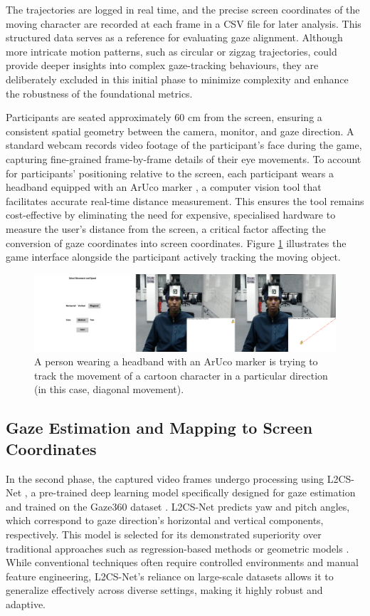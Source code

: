\documentclass[10pt,a4paper,twoside]{article}
\begin{document}
The trajectories are logged in real time, and the precise screen coordinates of the moving character are recorded at each frame in a CSV file for later analysis. This structured data serves as a reference for evaluating gaze alignment. Although more intricate motion patterns, such as circular or zigzag trajectories, could provide deeper insights into complex gaze-tracking behaviours, they are deliberately excluded in this initial phase to minimize complexity and enhance the robustness of the foundational metrics.

Participants are seated approximately 60 cm from the screen, ensuring a consistent spatial geometry between the camera, monitor, and gaze direction. A standard webcam records video footage of the participant’s face during the game, capturing fine-grained frame-by-frame details of their eye movements. To account for participants’ positioning relative to the screen, each participant wears a headband equipped with an ArUco marker \cite{GARRIDOJURADO20142280}, a computer vision tool that facilitates accurate real-time distance measurement. This ensures the tool remains cost-effective by eliminating the need for expensive, specialised hardware to measure the user's distance from the screen, a critical factor affecting the conversion of gaze coordinates into screen coordinates. Figure \ref{fig:game} illustrates the game interface alongside the participant actively tracking the moving object.

\begin{figure}[htbp]
    \centering
    \includegraphics[width=\textwidth]{image/game_ui.png}
    \caption{A person wearing a headband with an ArUco marker is trying to track the movement of a cartoon character in a particular direction (in this case, diagonal movement).}
    \label{fig:game}
\end{figure}

\subsection{Gaze Estimation and Mapping to Screen Coordinates}
\label{gaze}

In the second phase, the captured video frames undergo processing using L2CS-Net \cite{abdelrahman2022}, a pre-trained deep learning model specifically designed for gaze estimation and trained on the Gaze360 dataset \cite{kellnhofer2019}. L2CS-Net predicts yaw and pitch angles, which correspond to gaze direction's horizontal and vertical components, respectively. This model is selected for its demonstrated superiority over traditional approaches such as regression-based methods or geometric models \cite{abdelrahman2022}. While conventional techniques often require controlled environments and manual feature engineering, L2CS-Net’s reliance on large-scale datasets allows it to generalize effectively across diverse settings, making it highly robust and adaptive.
\end{document}
